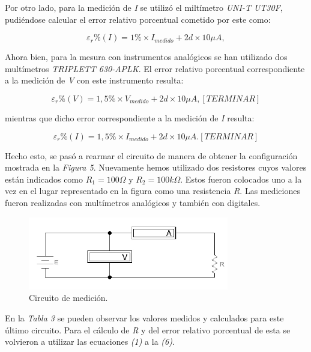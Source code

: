 \documentclass{article}
\begin{document}
	Por otro lado, para la medición de \textit{I} se utilizó el miltímetro \textit{UNI-T UT30F}, pudiéndose calcular el error relativo porcentual cometido por este como:
\medskip

\begin{equation}
 	\varepsilon_r\%(I) = 1\%\times I_{medido} + 2d\times10\mu A,
\end{equation}
\smallskip


	Ahora bien, para la mesura con instrumentos analógicos se han utilizado dos multímetros \textit{TRIPLETT 630-APLK}. El error relativo porcentual correspondiente a la medición de \textit{V} con este instrumento resulta:

\begin{equation}
 	\varepsilon_r\%(V) = 1,5\%\times V_{medido} + 2d\times10\mu A, [ TERMINAR ]
\end{equation}
\smallskip	

\noindent mientras que dicho error correspondiente a la medición de \textit{I} resulta:

\begin{equation}
 	\varepsilon_r\%(I) = 1,5\%\times I_{medido} + 2d\times10\mu A.  [ TERMINAR ]
\end{equation}
\medskip



	Hecho esto, se pasó a rearmar el circuito de manera de obtener la configuración mostrada en la \textit{Figura 5}. Nuevamente hemos utilizado dos resistores cuyos valores están indicados como \textit{$R_1=100\Omega$} y \textit{$R_2=100k\Omega$}. Estos fueron colocados uno a la vez en el lugar representado en la figura como una resistencia \textit{R}. Las mediciones fueron realizadas con multímetros analógicos y también con digitales.
\bigskip

\begin{figure}[h]
	\centering
	\includegraphics[width=0.78\textwidth]{images/p2-item-b.jpg}
	\caption{Circuito de medición.}
\end{figure}
\bigskip\bigskip


\noindent En la \textit{Tabla 3} se pueden observar los valores medidos y calculados para este último circuito. Para el cálculo de \textit{R} y del error relativo porcentual de esta se volvieron a utilizar las ecuaciones \textit{(1)} a la \textit{(6)}.
\bigskip\medskip
\end{document}
